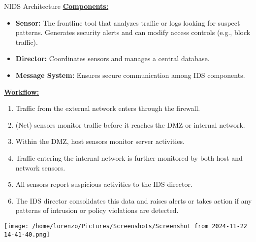 \begin{quotebox-grey}{NIDS Architecture}
\underline{\textbf{Components:}}
\begin{itemize}
    \item \textbf{Sensor:} The frontline tool that analyzes traffic or logs looking for suspect patterns. Generates security alerts and can modify access controls (e.g., block traffic).
    \item \textbf{Director:} Coordinates sensors and manages a central database.
    \item \textbf{Message System:}  Ensures secure communication among IDS components.
\end{itemize}
\begin{minipage}{0.5\textwidth}
\underline{\textbf{Workflow:}}
\begin{enumerate}
    \item Traffic from the external network enters through the firewall.
    \item (Net) sensors monitor traffic before it reaches the DMZ or internal network.
    \item Within the DMZ, host sensors monitor server activities.
    \item Traffic entering the internal network is further monitored by both host and network sensors.
    \item All sensors report suspicious activities to the IDS director.
    \item The IDS director consolidates this data and raises alerts or takes action if any patterns of intrusion or policy violations are detected.
\end{enumerate}
\end{minipage} 
\hspace{0.2cm}
\begin{minipage}{0.5\textwidth}
    \centering
    \texttt{[image: /home/lorenzo/Pictures/Screenshots/Screenshot from 2024-11-22 14-41-40.png]}
\end{minipage}
\end{quotebox-grey}

